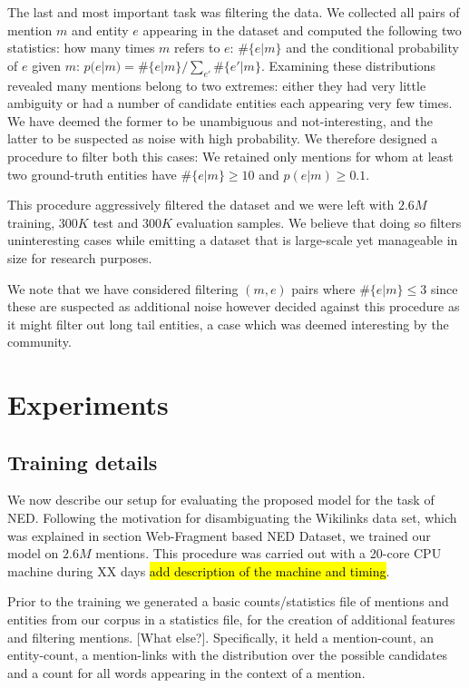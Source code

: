 \documentclass[11pt]{article}
\begin{document}
	The last and most important task was filtering the data. We collected all pairs of mention $m$ and entity $e$ appearing in the dataset and computed the following two statistics: how many times $m$ refers to $e$: $\#\{e|m\}$ and the conditional probability of $e$ given $m$: $p(e|m)=\#\{e|m\}/\sum_{e'}\#\{e'|m\}$. Examining these distributions revealed many mentions belong to two extremes: either they had very little ambiguity or had a number of candidate entities each appearing very few times. We have deemed the former to be unambiguous and not-interesting, and the latter to be suspected as noise with high probability. We therefore designed a procedure to filter both this cases: We retained only mentions for whom at least two ground-truth entities have $\#\{e|m\}\ge 10$ and $p(e|m)\ge0.1$. 
	
	This procedure aggressively filtered the dataset and we were left with $2.6M$ training, $300K$ test and $300K$ evaluation samples. We believe that doing so filters uninteresting cases while emitting a dataset that is large-scale yet manageable in size for research purposes. 
	
	We note that we have considered filtering $(m,e)$ pairs where $\#\{e|m\}\le 3$ since these are suspected as additional noise however decided against this procedure as it might filter out long tail entities, a case which was deemed interesting by the community.
	
	\section{Experiments} \label{experiments}
	
	\subsection{Training details}
	We now describe our setup for evaluating the proposed model for the task of NED. Following the motivation for disambiguating the Wikilinks data set, which was explained in section \refname{Web-Fragment based NED Dataset}, we trained our model on $2.6M$ mentions. This procedure was carried out with a 20-core CPU machine during XX days \hl{add description of the machine and timing}.
	
	Prior to the training we generated a basic counts/statistics file of mentions and entities from our corpus in a statistics file, for the creation of additional features and filtering mentions.  [What else?]. Specifically, it held a mention-count, an entity-count, a mention-links with the distribution over the possible candidates and a count for all words appearing in the context of a mention. 
\end{document}
